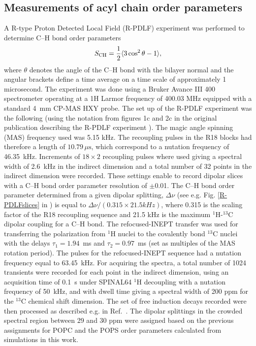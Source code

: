 \documentclass[journal=jpcbfk,manuscript=article]{achemso}
\begin{document}
\subsection{Measurements of acyl chain order parameters}
A R-type Proton Detected Local Field (R-PDLF) experiment was performed to determine C--H bond order
parameters
\begin{equation}\label{OPequation}
  S_{\rm{CH}}=\frac{1}{2}\langle3\cos^2\theta-1\rangle,
\end{equation}
  where $\theta$ denotes the angle of the C--H bond
with the bilayer normal and the angular brackets define a time average on a time scale of approximately 1 microsecond.
The experiment was done using a Bruker Avance III 400 spectrometer operating at a 1H Larmor frequency of 400.03 MHz
equipped with a standard 4~mm CP-MAS HXY probe. The set up of the R-PDLF experiment was the following
(using the notation from figures 1c and 2c in the original publication describing the R-PDLF experiment \cite{dvinskikh04}).
The magic angle spinning (MAS) frequency used was 5.15 kHz. The recoupling pulses in the R18 blocks had
therefore a length of $10.79 \, \mu \mathrm{s}$, which correspond to a nutation frequency of 46.35~kHz. Increments of $18 \times 2$ recoupling
pulses where used giving a spectral width of 2.6~kHz in the indirect dimension and a total number of 32 points in
the indirect dimension were recorded. These settings enable to record dipolar slices with a C--H bond order parameter
resolution of $\pm$0.01. The C--H bond order parameter determined from a given dipolar
splitting, $\Delta\nu$ (see e.g. Fig. \ref{R-PDLFslices} in ) is equal to $\Delta\nu/(0.315\times21.5 kHz)$, where 0.315 is
the scaling factor of the R18 recoupling sequence and 21.5 kHz is the maximum $^1$H-$^{13}$C dipolar coupling for a C--H bond.
The refocused-INEPT transfer \cite{morris79,burum80} %
was used for transferring the polarization from $^1$H nuclei to the covalently bond $^{13}$C nuclei with the delays $\tau_1 = 1.94$~ms and $\tau_2 = 0.97$~ms
(set as multiples of the MAS rotation period). The pulses for the refocused-INEPT sequence had a nutation frequency equal to 63.45~kHz.
For acquiring the spectra, a total number of 1024 transients were recorded for each point in the indirect dimension, using an acquisition
time of 0.1~s under SPINAL64 $^1$H decoupling \cite{fung00} with a nutation frequency of 50~kHz, and with dwell time giving a spectral
width of 200 ppm for the $^{13}$C chemical shift dimension. The set of free induction decays recorded were then processed as
described e.g. in Ref.~. The dipolar splittings in the crowded spectral region
between 29 and 30 ppm were assigned based on the previous assignments for POPC \cite{ferreira13} 
and the POPS order parameters calculated from simulations in this work.
 
\end{document}
